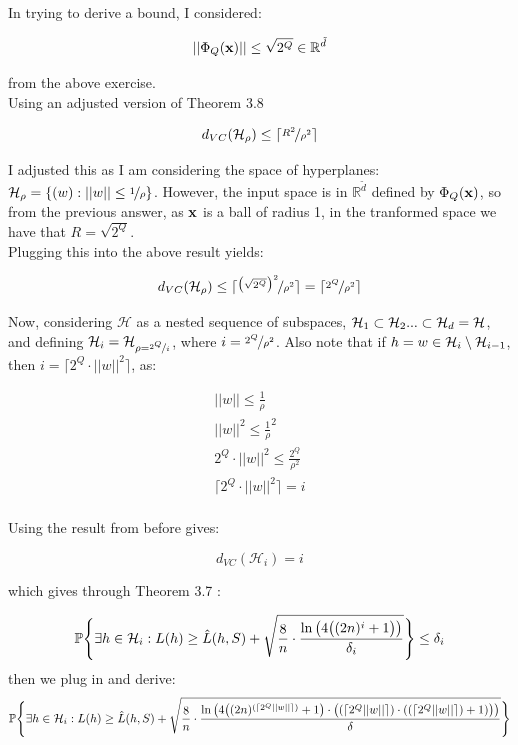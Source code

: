 \documentclass{scrartcl}
\begin{document}
\subsection{}

In trying to derive a bound, I considered:

\[
|| \Phi_Q({\mathbf x}) || \leq \sqrt{ 2^Q } \in \mathbb{R}^{\tilde{d}}
\]

from the above exercise.\\

Using an adjusted version of Theorem 3.8 \cite[p. 18]{mln}

\[ d_{VC} (\mathcal{H}_\rho) \leq \lceil \nicefrac{R^2} {\rho^2} \rceil \]

I adjusted this as I am considering the space of hyperplanes: $ \mathcal{H}_\rho = \{ (w) : || w || \leq \nicefrac {1} {\rho} \}$. However, the input space is in $\mathbb{R}^{\tilde{d}}$ defined by $\Phi_Q ({\mathbf x})$, so from the previous answer, as ${\mathbf x}$ is a ball of radius 1, in the tranformed space we have that $R = \sqrt{ 2^Q }$.\\

Plugging this into the above result yields:

\[ d_{VC} (\mathcal{H}_\rho) \leq \lceil \nicefrac { \big( \sqrt{ 2^Q } \big) ^2 } { \rho^2 } \rceil = \lceil \nicefrac{2^Q} {\rho^2} \rceil \]

Now, considering $\mathcal{H}$ as a nested sequence of subspaces, ${\mathcal{H}}_1 \subset {\mathcal{H}}_2 ... \subset {\mathcal{H}}_d = {\mathcal{H}}$, and defining ${\mathcal{H}}_i = {\mathcal{H}}_{\rho = \nicefrac {2^Q} {i}}$, where $i = \nicefrac {2^Q} {\rho^2}$. Also note that if $h = w \in {\mathcal{H}}_i \setminus {\mathcal{H}}_{i-1}$,
then $i = \lceil 2^Q \cdot || w ||^2 \rceil $, as:

\begin{align*}
    || w || \leq \frac {1} {\rho} \\
    || w ||^2 \leq \frac {1} {\rho}^2 \\
    2^Q \cdot || w ||^2 \leq \frac {2^Q} {\rho^2} \\
    \lceil 2^Q \cdot || w ||^2 \rceil = i \\
\end{align*}

Using the result from before gives:

\[ d_{VC} (\mathcal{H}_i) = i\]

which gives through Theorem 3.7 \cite[p.18]{mln}:

\[
    \mathbb{P} \Bigg\{
        \exists h \in {\mathcal{H}}_i : L(h) \geq \hat{L} (h, S) +
        \sqrt {
            \frac {8} {n} \cdot
            \frac { \ln \big(
            4 \big(
            ( 2n )^i + 1
            \big)
            \big ) } {\delta_i}
        }
    \Bigg\} \leq \delta_i
\]
 then we plug in and derive:
\[
    \mathbb{P} \Bigg\{
        \exists h \in {\mathcal{H}}_i : L(h) \geq \hat{L} (h, S) +
        \sqrt {
            \frac {8} {n} \cdot
            \frac { \ln \big(
            4 \big(
                ( 2n )^{(\lceil 2^Q || w ||\rceil)} + 1
            \big)
            \cdot
            \big( {(\lceil 2^Q || w ||\rceil)} \cdot ({(\lceil 2^Q || w ||\rceil)} + 1) \big)
            \big) } {\delta}
        }
    \Bigg\}
\]
\end{document}

